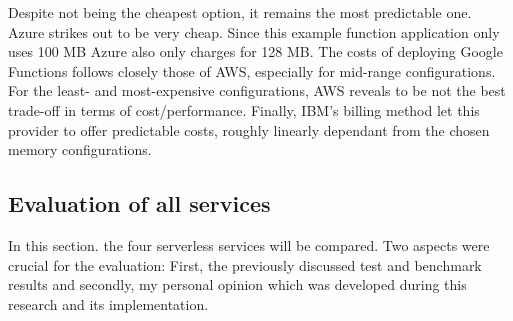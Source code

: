 Despite not being the cheapest option, it remains the most predictable one. 
Azure strikes out to be very cheap. Since this example function application only uses 100 \gls{MB} Azure also only charges for 128 \gls{MB}.  
The costs of deploying Google Functions follows closely those of \gls{AWS}, especially for mid-range configurations.
For the least- and most-expensive configurations, AWS reveals to be not the best trade-off in terms of cost/performance.
Finally, IBM's billing method let this provider to offer predictable costs, roughly linearly dependant from the chosen memory configurations.

\subsection{Evaluation of all services}
In this section. the four serverless services will be compared. Two aspects were crucial for the evaluation: First, the previously discussed test and benchmark results and secondly, my personal opinion which was developed during this research and its implementation.
